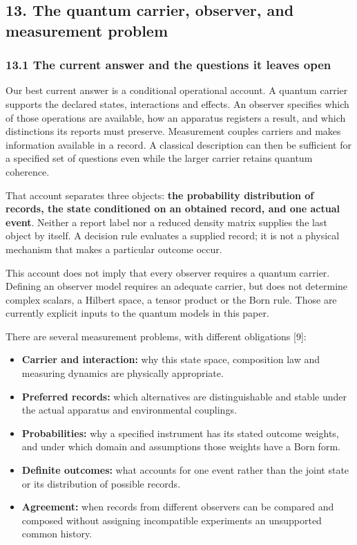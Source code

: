 \documentclass[
  11pt,
]{article}
\providecommand{\tightlist}{%
  \setlength{\itemsep}{0pt}\setlength{\parskip}{0pt}}
\begin{document}
\subsection{13. The quantum carrier, observer, and measurement
problem}\label{the-quantum-carrier-observer-and-measurement-problem}

\subsubsection{13.1 The current answer and the questions it leaves
open}\label{the-current-answer-and-the-questions-it-leaves-open}

Our best current answer is a conditional operational account. A quantum
carrier supports the declared states, interactions and effects. An
observer specifies which of those operations are available, how an
apparatus registers a result, and which distinctions its reports must
preserve. Measurement couples carriers and makes information available
in a record. A classical description can then be sufficient for a
specified set of questions even while the larger carrier retains quantum
coherence.

That account separates three objects: \textbf{the probability
distribution of records, the state conditioned on an obtained record,
and one actual event}. Neither a report label nor a reduced density
matrix supplies the last object by itself. A decision rule evaluates a
supplied record; it is not a physical mechanism that makes a particular
outcome occur.

This account does not imply that every observer requires a quantum
carrier. Defining an observer model requires an adequate carrier, but
does not determine complex scalars, a Hilbert space, a tensor product or
the Born rule. Those are currently explicit inputs to the quantum models
in this paper.

There are several measurement problems, with different obligations
{[}9{]}:

\begin{itemize}
\tightlist
\item
  \textbf{Carrier and interaction:} why this state space, composition
  law and measuring dynamics are physically appropriate.
\item
  \textbf{Preferred records:} which alternatives are distinguishable and
  stable under the actual apparatus and environmental couplings.
\item
  \textbf{Probabilities:} why a specified instrument has its stated
  outcome weights, and under which domain and assumptions those weights
  have a Born form.
\item
  \textbf{Definite outcomes:} what accounts for one event rather than
  the joint state or its distribution of possible records.
\item
  \textbf{Agreement:} when records from different observers can be
  compared and composed without assigning incompatible experiments an
  unsupported common history.
\end{itemize}
\end{document}
